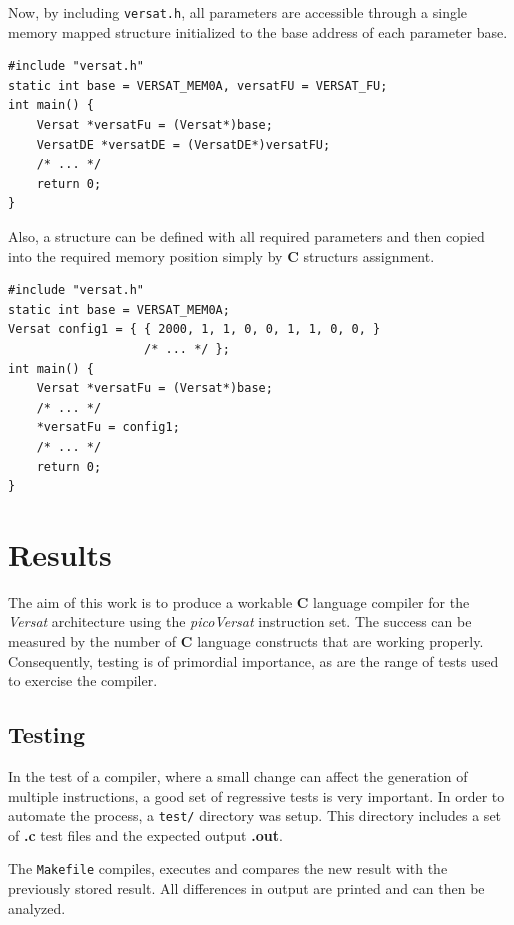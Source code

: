 \documentclass[journal]{IEEEtran}
\begin{document}
Now, by including {\tt versat.h}, all parameters are accessible through
a single memory mapped structure initialized to the base address of each
parameter base.

{\footnotesize
\begin{verbatim}
#include "versat.h"
static int base = VERSAT_MEM0A, versatFU = VERSAT_FU;
int main() {
    Versat *versatFu = (Versat*)base;
    VersatDE *versatDE = (VersatDE*)versatFU;
    /* ... */
    return 0;
}
\end{verbatim}
}

Also, a structure can be defined with all required parameters and then copied
into the required memory position simply by {\bf C} structurs assignment.

{\footnotesize
\begin{verbatim}
#include "versat.h"
static int base = VERSAT_MEM0A;
Versat config1 = { { 2000, 1, 1, 0, 0, 1, 1, 0, 0, }
                   /* ... */ };
int main() {
    Versat *versatFu = (Versat*)base;
    /* ... */
    *versatFu = config1;
    /* ... */
    return 0;
}
\end{verbatim}
}

\section{Results}
\label{sec:results}

The aim of this work is to produce a workable {\bf C} language
compiler for the {\it Versat} architecture using the {\it picoVersat}
instruction set.
The success can be measured by the number of {\bf C} language
constructs that are working properly.
Consequently, testing is of primordial importance, as are the range
of tests used to exercise the compiler.


\subsection{Testing}

In the test of a compiler, where a small change can affect the
generation of multiple instructions, a good set of
regressive tests is very important.
In order to automate the process, a {\tt test/} directory
was setup.
This directory includes a set of {\bf .c} test files and
the expected output {\bf .out}.

The {\tt Makefile} compiles, executes and compares the new
result with the previously stored result.
All differences in output are printed and can then be analyzed.
\end{document}
